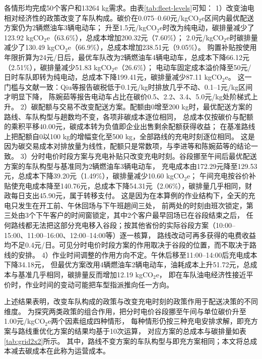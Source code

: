 各情形均完成50个客户和13264 kg需求。由表\ref{tab:fleet-levels}可知：
1）改变油电相对经济性的政策改变了车队构成。碳价在0.075--0.60元/kgCO$_2$e区间内最优配送方案仍为2辆燃油车3辆电动车；
升至1.5元/kgCO$_2$e时改为纯电动，碳排量减少了123.92 kgCO$_2$e（63.6\%），总成本增加200.32元（7.60\%）；
2.0元/kgCO$_2$e时碳排量减少了130.49 kgCO$_2$e（66.9\%），总成本增加238.51元（9.05\%）。
购置补贴按使用年限折算为24元/日后，最优车队改为2辆燃油车4辆电动车，总成本下降66.12元（2.51\%），碳排量减少51.83 kgCO$_2$e（26.6\%）；
电动车固定成本溢价降至50元/日时车队即转为纯电动，总成本下降199.41元，碳排量减少87.11 kgCO$_2$e。
这一门槛与文献一致：Qiu等\cite{ref:qiu2024}报告碳税低于0.1元/kg时排放几乎不动、0.1--1元/kg区间才明显下降，
陈婉茹等\cite{ref:23}报告电动车占比在碳价0.5、2.2、3.4、5.0元/kg处阶梯式上升。
2）碳配额与交易不改变配送方案。配额由0增至200 kg时，最优配送方案的路线、车队构型与趟数均不变，各项非碳成本逐位相同，
总成本仅按碳价与配额的乘积平移40.00元，碳成本转为负值即企业出售剩余配额获得收益；
在基准路线上把配额自0以100 kg的增幅变化至500 kg，全部路线的充电时刻逐位相同。
这是因为碳交易成本对排放量为线性，配额只是常数项，与李进等\cite{ref:lijin2014}和陈婉茹等\cite{ref:23}的结论一致。
3）分时电价时段方案与充电补贴只改变充电时刻。谷段挪至午间后最优配送方案的车队构型与基准同为2辆燃油车3辆电动车，
充电成本由172.29元降至129.53元，总成本下降39.20元（1.49\%），碳排量减少10.60 kgCO$_2$e；
午间充电按谷价补贴使充电成本降至140.76元，总成本下降54.31元（2.06\%），碳排量几乎相同，财政每日支出45.90元，属于转移支付。
这是因为在本算例的作业结构下，全天的充电只发生在开工前、午休回场与下午班趟间三处，
前两处的时刻由班次锁定，第三处由3个下午客户的时间窗锁定，其中2个客户最早回场已在谷段结束之后，
任何路线都无法把这部分充电移入谷段；按其他省份的实际谷段方案（10:00--15:00、11:00--16:00、12:00--14:00等）逐一核算，
路线改动可再多获得的电费收益均不足0.4元/日。可见分时电价时段方案的作用取决于谷段的位置，而不取决于路线的安排。
4）作业时间调整的作用方向不定。午休后移至11:00--14:00后充电成本下降34.18元，
但最优方案改用4辆燃油车2辆电动车，油耗成本上升51.72元，总成本与基准几乎相同，碳排量反而增加12.19 kgCO$_2$e，
即在车队油电经济性接近平价时，作业时间的变动可能把车型指派推向任一方向。

上述结果表明，改变车队构成的政策与改变充电时刻的政策作用于配送决策的不同维度。
为探究两类政策的组合作用，把分时电价谷段挪至午间与单位碳价升至1.00元/kgCO$_2$e两个因素组成四种情形，
每种情形仍按三种充电安排求解，即充方案与路线重优化方案的结果均基于10次运算，
对应方案的总成本与碳排量如表\ref{tab:grid2x2}所示。
其中，路线不变方案的车队构型与即充方案相同；本文将总成本减去碳成本在此称为运营成本。

